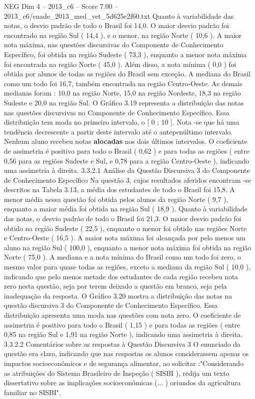 \begin{textsample}{NEG Dim 4 – 2013\_c6 – Score 7.00 – 2013\_c6/enade\_2013\_med\_vet\_5d625e2f60.txt}
Quanto à variabilidade das notas, o desvio padrão de todo o Brasil foi 14,0.
O maior desvio padrão foi encontrado na região Sul ( 14,4 ), e o menor, na região Norte ( 10,6 ).
A maior nota máxima, nas questões discursivas do Componente de Conhecimento Específico, foi obtida na região Sudeste ( 73,3 ), enquanto a menor nota máxima foi encontrada na região Norte ( 45,0 ).
Além disso, a nota mínima ( 0,0 ) foi obtida por alunos de todas as regiões do Brasil sem exceção.
A mediana do Brasil como um todo foi 16,7, também encontrada na região Centro-Oeste.
As demais medianas foram : 10,0 na região Norte, 15,0 na região Nordeste, 18,3 na região Sudeste e 20,0 na região Sul.
O Gráfico 3.19 representa a distribuição das notas nas questões discursivas no Componente de Conhecimento Específico.
Essa distribuição tem moda no primeiro intervalo, o [ 0 ; 10 ].
Nota -se que há uma tendência decrescente a partir deste intervalo até o antepenúltimo intervalo.
Nenhum aluno recebeu notas \textbf{alocadas} nos dois últimos intervalos.
O coeficiente de assimetria é positivo para todo o Brasil ( 0,62 ) e para todas as regiões ( entre 0,56 para as regiões Sudeste e Sul, e 0,78 para a região Centro-Oeste ), indicando uma assimetria à direita. 3.3.2.1 Análise da Questão Discursiva 3 do Componente de Conhecimento Específico Na questão 3, cujos resultados aferidos encontram -se descritos na Tabela 3.13, a média dos estudantes de todo o Brasil foi 15,8.
A menor média nessa questão foi obtida pelos alunos da região Norte ( 9,7 ), enquanto a maior média foi obtida na região Sul ( 18,9 ).
Quanto à variabilidade das notas, o desvio padrão de todo o Brasil foi 21,3.
O maior desvio padrão foi obtido na região Sudeste ( 22,5 ), enquanto o menor foi obtido nas regiões Norte e Centro-Oeste ( 16,5 ).
A maior nota máxima foi alcançada por pelo menos um aluno na região Sul ( 100,0 ), enquanto a menor nota máxima foi obtida na região Norte ( 75,0 ).
A mediana e a nota mínima do Brasil como um todo foi zero, o mesmo valor para quase todas as regiões, exceto a mediana da região Sul ( 10,0 ), indicando que pelo menos metade dos estudantes de cada região recebeu nota zero nesta questão, seja por terem deixado a questão em branco, seja pela inadequação da resposta.
O Gráfico 3.20 mostra a distribuição das notas na questão discursiva 3 do Componente de Conhecimento Específico.
Essa distribuição apresenta uma moda nas questões com nota zero.
O coeficiente de assimetria é positivo para todo o Brasil ( 1,15 ) e para todas as regiões ( entre 0,85 na região Sul e 1,91 na região Norte ), indicando uma assimetria à direita. 3.3.2.2 Comentários sobre as respostas à Questão Discursiva 3 O enunciado da questão era claro, indicando que nas respostas os alunos considerassem apenas os impactos socioeconômicos e de segurança alimentar, ao solicitar :"Considerando as atribuições do Sistema Brasileiro de Inspeção ( SISBI ), redija um texto dissertativo sobre as implicações socioeconômicas (... ) oriundos da agricultura familiar no SISBI".

\end{textsample}
